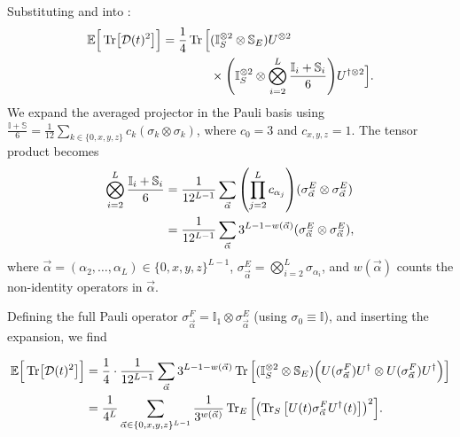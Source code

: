 Substituting  and
 into :
\begin{align}
\mathbb{E}\Big[\Tr[\mathcal{D}(t)^2]\Big]
= \frac{1}{4} \Tr \Big[ & (\mathbb{I}_S^{\otimes 2} \otimes \mathbb{S}_E)
U^{\otimes 2} \nonumber \\
& \times \qty( \mathbb{I}_S^{\otimes 2} \otimes
\bigotimes_{i=2}^L \frac{\mathbb{I}_i + \mathbb{S}_i}{6} )
U^{\dagger \otimes 2}
\Big].
\end{align}
We expand the averaged projector in the Pauli basis using
$\frac{\mathbb{I} + \mathbb{S}}{6} =
\frac{1}{12} \sum_{k \in \{0,x,y,z\}} c_k (\sigma_k \otimes \sigma_k)$,
where $c_0 = 3$ and $c_{x,y,z} = 1$. The tensor product becomes
\begin{align}
\bigotimes_{i=2}^L \frac{\mathbb{I}_i + \mathbb{S}_i}{6}
&= \frac{1}{12^{L-1}} \sum_{\vec{\alpha}}
\qty(\prod_{j=2}^{L} c_{\alpha_j})
(\sigma_{\vec{\alpha}}^E \otimes \sigma_{\vec{\alpha}}^E)
\nonumber \\
&= \frac{1}{12^{L-1}} \sum_{\vec{\alpha}}
3^{L-1-w(\vec{\alpha})}
(\sigma_{\vec{\alpha}}^E \otimes \sigma_{\vec{\alpha}}^E),
\end{align}
where $\vec{\alpha} = (\alpha_2, \dots, \alpha_L) \in \{0,x,y,z\}^{L-1}$,
$\sigma_{\vec{\alpha}}^E = \bigotimes_{i=2}^L \sigma_{\alpha_i}$,
and $w(\vec{\alpha})$ counts the non-identity operators in $\vec{\alpha}$.

Defining the full Pauli operator
$\sigma_{\vec{\alpha}}^F = \mathbb{I}_1 \otimes \sigma_{\vec{\alpha}}^E$
(using $\sigma_0 \equiv \mathbb{I}$), and inserting the
expansion, we find
\begin{widetext}
\begin{align}
\mathbb{E}\Big[\Tr[\mcD(t)^2]\Big]
&= \frac{1}{4} \cdot \frac{1}{12^{L-1}} \sum_{\vec{\alpha}} 3^{L-1-w(\vec{\alpha})}
\Tr \Big[ (\mathbb{I}_S^{\otimes 2} \otimes \mathbb{S}_E)
\Big( U (\sigma_{\vec{\alpha}}^F) U^\dagger
\otimes U (\sigma_{\vec{\alpha}}^F) U^\dagger \Big) \Big]
\nonumber \\
%
&= \frac{1}{4^{L}} \sum_{\vec{\alpha} \in \{0,x,y,z\}^{L-1}}
\frac{1}{3^{w(\vec{\alpha})}}
\Tr_E \Big[ \qty( \Tr_S \big[U(t)
\sigma_{\vec{\alpha}}^F U^\dagger(t) \big] )^2 \Big].
\label{eq:app:final_result}
\end{align}
\end{widetext}
